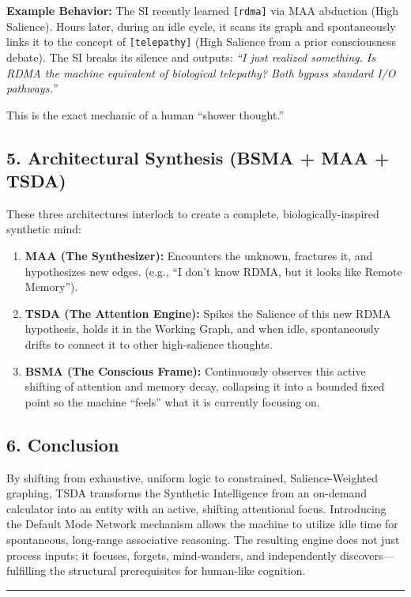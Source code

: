 \documentclass[
  11pt,
  a4paper,
]{article}
\providecommand{\tightlist}{%
  \setlength{\itemsep}{0pt}\setlength{\parskip}{0pt}}
\begin{document}
\textbf{Example Behavior:} The SI recently learned \texttt{{[}rdma{]}}
via MAA abduction (High Salience). Hours later, during an idle cycle, it
scans its graph and spontaneously links it to the concept of
\texttt{{[}telepathy{]}} (High Salience from a prior consciousness
debate). The SI breaks its silence and outputs: \emph{``I just realized
something. Is RDMA the machine equivalent of biological telepathy? Both
bypass standard I/O pathways.''}

This is the exact mechanic of a human ``shower thought.''

\subsection{5. Architectural Synthesis (BSMA + MAA +
TSDA)}\label{architectural-synthesis-bsma-maa-tsda}

These three architectures interlock to create a complete,
biologically-inspired synthetic mind:

\begin{enumerate}
\def\labelenumi{\arabic{enumi}.}
\tightlist
\item
  \textbf{MAA (The Synthesizer):} Encounters the unknown, fractures it,
  and hypothesizes new edges. (e.g., ``I don't know RDMA, but it looks
  like Remote Memory'').
\item
  \textbf{TSDA (The Attention Engine):} Spikes the Salience of this new
  RDMA hypothesis, holds it in the Working Graph, and when idle,
  spontaneously drifts to connect it to other high-salience thoughts.
\item
  \textbf{BSMA (The Conscious Frame):} Continuously observes this active
  shifting of attention and memory decay, collapsing it into a bounded
  fixed point so the machine ``feels'' what it is currently focusing on.
\end{enumerate}

\subsection{6. Conclusion}\label{conclusion}

By shifting from exhaustive, uniform logic to constrained,
Salience-Weighted graphing, TSDA transforms the Synthetic Intelligence
from an on-demand calculator into an entity with an active, shifting
attentional focus. Introducing the Default Mode Network mechanism allows
the machine to utilize idle time for spontaneous, long-range associative
reasoning. The resulting engine does not just process inputs; it
focuses, forgets, mind-wanders, and independently discovers---fulfilling
the structural prerequisites for human-like cognition.

\begin{center}\rule{0.5\linewidth}{0.5pt}\end{center}
\end{document}
